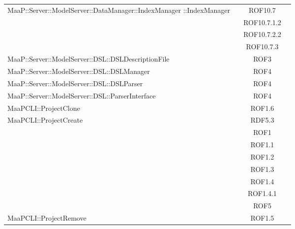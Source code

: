 \begin{center}
\begin{longtable}{|p{0.8\linewidth}|c|}
\midrule
MaaP::Server::ModelServer::DataManager::IndexManager ::IndexManager
& ROF10.7\\
& ROF10.7.1.2\\
& ROF10.7.2.2\\
& ROF10.7.3\\

\midrule
MaaP::Server::ModelServer::DSL::DSLDescriptionFile
& ROF3\\

\midrule
MaaP::Server::ModelServer::DSL::DSLManager
& ROF4\\

\midrule
MaaP::Server::ModelServer::DSL::DSLParser
& ROF4\\

\midrule
MaaP::Server::ModelServer::DSL::ParserInterface
& ROF4\\

\midrule
MaaPCLI::ProjectClone
& ROF1.6\\

\midrule
MaaPCLI::ProjectCreate
& RDF5.3\\
& ROF1\\
& ROF1.1\\
& ROF1.2\\
& ROF1.3\\
& ROF1.4\\
& ROF1.4.1\\
& ROF5\\

\midrule
MaaPCLI::ProjectRemove
& ROF1.5\\

\end{longtable}
\end{center}

\newpage
